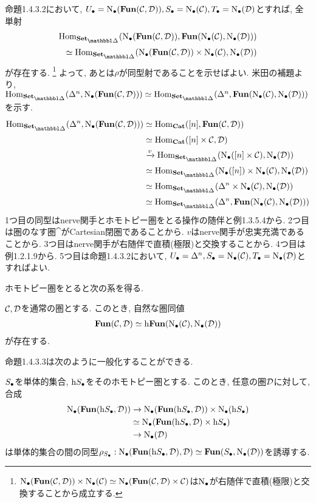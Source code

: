 \documentclass[uplatex, a4paper, 14Q, dvipdfmx]{jsreport}
\begin{document}
\begin{Proof}
  命題1.4.3.2において, $\U=\N(\fun(\calC,\calD)), \S=\N(\calC), \T=\N(\calD)$とすれば, 全単射
  \begin{align*}
    \Hom_{\sset}(\N(\fun(\calC,\calD)), \fun(\N(\calC),\N(\calD))) \\
    \simeq \Hom_{\sset}(\N(\fun(\calC,\calD)) \ti \N(\calC), \N(\calD))
  \end{align*}
  が存在する. 
  \footnote{
    $\N(\fun(\calC,\calD)) \ti \N(\calC) \simeq \N(\fun(\calC,\calD) \ti \calC)$は$\N$が右随伴で直積(極限)と交換することから成立する. 
  }
  よって, あとは$\rho$が同型射であることを示せばよい. 
  米田の補題より, $\Hom_{\sset}(\Delta^n,\N(\fun(\calC,\calD))) \simeq \Hom_{\sset}(\Delta^n,\fun(\N(\calC),\N(\calD)))$を示す. 
  \begin{align*}
    \Hom_{\sset}(\Delta^n,\N(\fun(\calC,\calD))) 
    &\simeq \Hom_{\cat}([n],\fun(\calC,\calD)) \\
    &\simeq \Hom_{\cat}([n] \ti \calC,\calD) \\
    &\xr{v} \Hom_{\sset}(\N([n] \ti \calC),\N(\calD)) \\
    &\simeq \Hom_{\sset}(\N([n]) \ti \N(\calC),\N(\calD)) \\
    &\simeq \Hom_{\sset}(\Delta^n \ti \N(\calC),\N(\calD)) \\
    &\simeq \Hom_{\sset}(\Delta^n, \fun(\N(\calC),\N(\calD)))
  \end{align*}
  1つ目の同型はnerve関手とホモトピー圏をとる操作の随伴と例1.3.5.4から. 
  2つ目は圏のなす圏$\cat$がCartesian閉圏であることから. 
  $v$はnerve関手が忠実充満であることから.
  3つ目はnerve関手が右随伴で直積(極限)と交換することから. 
  4つ目は例1.2.1.9から. 
  5つ目は命題1.4.3.2において, $\U=\Delta^n, \S=\N(\calC), \T=\N(\calD)$とすればよい.
\end{Proof}

ホモトピー圏をとると次の系を得る. 

\begin{cor}
  $\calC, \calD$を通常の圏とする.
  このとき, 自然な圏同値
  \begin{align*}
    \fun(\calC,\calD) \simeq \h \fun(\N(\calC),\N(\calD))
  \end{align*}
  が存在する.
\end{cor}

命題1.4.3.3は次のように一般化することができる. 

\begin{cor}
  $\S$を単体的集合, $\h\S$をそのホモトピー圏とする.
  このとき, 任意の圏$\calD$に対して, 合成
  \begin{align*}
    \N(\fun(\h\S,\calD)) 
    &\to \N(\fun(\h\S,\calD)) \ti \N(\h\S) \\
    &\simeq \N(\fun(\h\S,\calD) \ti \h\S) \\
    &\to \N(\calD)
  \end{align*}
  は単体的集合の間の同型$\rho_{\S}: \N(\fun(\h\S,\calD),\calD) \simeq \fun(\S,\N(\calD))$を誘導する.
\end{cor}
\end{document}
